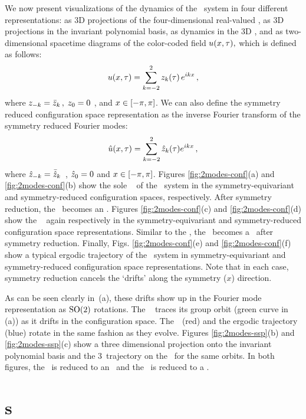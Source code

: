 \documentclass[aip,cha,
reprint,
secnumarabic,
nofootinbib, tightenlines,
nobibnotes, showkeys, showpacs,
superscriptaddress,
]{revtex4-1}
\begin{document}
We now present visualizations of the dynamics of the \twomode\ system in
four different representations: as 3D projections of the four-dimensional
real-valued \statesp, as 3D projections in the invariant polynomial
basis, as dynamics in the 3D \slicePlane, and as two-dimensional
spacetime diagrams of the color-coded field
$u(x,\tau),$ which is defined as follows:
\[
	u(x, \tau) = \sum_{k=-2}^{2} z_k(\tau) \, e^{i k x}
\,,
\]
where $z_{-k} = \bar{z}_k \,, \; 	z_0 = 0$ ,  and $x
\in [- \pi, \pi]$. We can also define the symmetry reduced configuration
space representation as the inverse Fourier transform of the symmetry
reduced Fourier modes:
\[
	\hat{u}(x, \tau) = \sum_{k=-2}^{2} \hat{z}_k(\tau) e^{i k x}
\,,
\]
where $\hat{z}_{-k} = \bar{\hat{z}}_k$ \,, \; 	$\hat{z}_0 = 0$ \;
and $x \in [- \pi, \pi]$. Figures \ref{fig:2modes-conf}(a) and \ref{fig:2modes-conf}(b) 
show the sole \reqv\ \REQV{}{} of the \twomode\ system in the symmetry-equivariant
and symmetry-reduced configuration spaces, respectively. After
symmetry reduction, the \reqv\ becomes an \eqv.
Figures \ref{fig:2modes-conf}(c) and \ref{fig:2modes-conf}(d) show the \rpo\  again
respectively in the symmetry-equivariant and symmetry-reduced
configuration space representations. Similar to the \reqv, the \rpo\
becomes a \po\ after symmetry reduction. Finally,
Figs. \ref{fig:2modes-conf}(e) and \ref{fig:2modes-conf}(f) show a typical ergodic trajectory of the
\twomode\ system in symmetry-equivariant and symmetry-reduced
configuration space representations. Note that in each case, symmetry
reduction cancels the `drifts' along the symmetry ($x$) direction.

As can be seen clearly in \,(a), these drifts show up in
the Fourier mode representation as $$ rotations. The \reqv\ \REQV{}{}
traces its \SOn{2} group orbit (green curve in \reffig{fig:2modes-ssp}\,(a))
as it drifts in the configuration space. The
\rpo\ \,(red) and the ergodic trajectory (blue) rotate
in the same fashion as they evolve. Figures \ref{fig:2modes-ssp}(b) and \ref{fig:2modes-ssp}(c)
show a three dimensional projection onto the invariant polynomial basis and the 3\dmn\
trajectory on the \slicePlane\ for the same orbits. In both figures, the \reqv\ is reduced
to an \eqv\ and the \rpo\ is reduced to a \po.

\section{\Po s}
\label{s:numerics}
\end{document}

